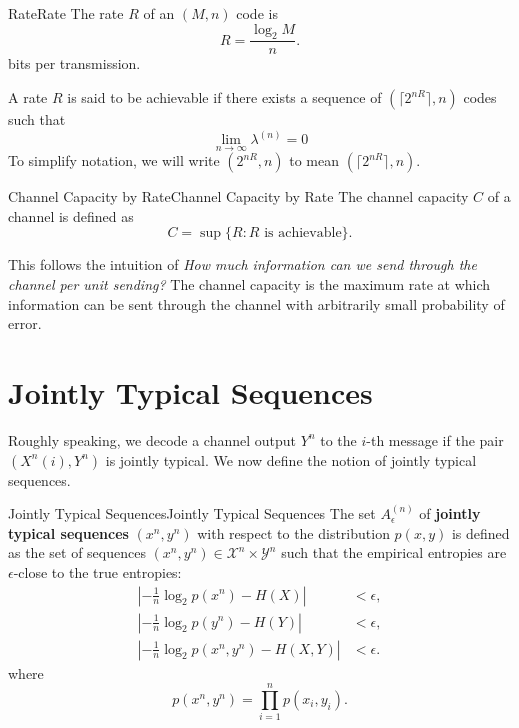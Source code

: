 \documentclass[../main.tex]{subfiles}
\begin{document}
\begin{definition}{Rate}{Rate}
	The rate $R$ of an $(M,n)$ code is
	\begin{equation}
		R = \frac{\log_2 M}{n}.
	\end{equation}
	bits per transmission.

	A rate $R$ is said to be achievable if there exists a sequence of $(\lceil 2^{nR} \rceil, n)$ codes such that
	\begin{equation}
		\lim_{n \to \infty} \lambda^{(n)} = 0
	\end{equation}
	To simplify notation, we will write $(2^{nR}, n)$ to mean $(\lceil 2^{nR} \rceil, n)$.
\end{definition}

\begin{definition}{Channel Capacity by Rate}{Channel Capacity by Rate}
	The channel capacity $C$ of a channel is defined as
	\begin{equation}
		C = \sup \{ R : R \text{ is achievable} \}.
	\end{equation}
\end{definition}
\begin{remark}
	This follows the intuition of \emph{How much information can we send through the channel per unit sending?} The channel capacity is the maximum rate at which information can be sent through the channel with arbitrarily small probability of error.
\end{remark}

\section{Jointly Typical Sequences}
Roughly speaking, we decode a channel output $Y^n$ to the $i$-th message if the pair $(X^n(i), Y^n)$ is jointly typical. We now define the notion of jointly typical sequences.

\begin{definition}{Jointly Typical Sequences}{Jointly Typical Sequences}
	The set $A_\epsilon^{(n)}$ of \textbf{jointly typical sequences} $(x^n, y^n)$ with respect to the distribution $p(x,y)$ is defined as the set of sequences $(x^n, y^n) \in \mathcal{X}^n \times \mathcal{Y}^n$ such that the empirical entropies are $\epsilon$-close to the true entropies:
	\begin{equation}
		\begin{aligned}
			\left| -\frac{1}{n} \log_2 p(x^n) - H(X) \right|        & < \epsilon, \\
			\left| -\frac{1}{n} \log_2 p(y^n) - H(Y) \right|        & < \epsilon, \\
			\left| -\frac{1}{n} \log_2 p(x^n, y^n) - H(X,Y) \right| & < \epsilon.
		\end{aligned}
	\end{equation}
	where
	\begin{equation}
		p(x^n, y^n) = \prod_{i=1}^n p(x_i, y_i).
	\end{equation}
\end{definition}
\end{document}
